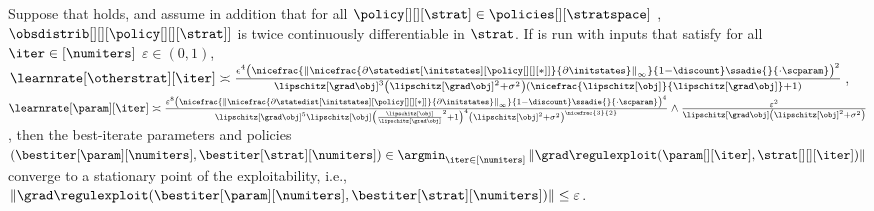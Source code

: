 \begin{reptheorem}[\ref{thm:apprenticeship_thm}]\label{thm_app:apprenticeship_thm}
    Suppose that  holds, and assume in addition that for all $\policy[][][\strat] \in \policies[][\stratspace]$ , $\obsdistrib[][][{\policy[][][\strat]}]$ is twice continuously differentiable in $\strat$.  
    If  is run with inputs that satisfy for all $\iter \in [\numiters]$ $\varepsilon \in (0,1)$,  $\learnrate[\otherstrat][\iter] \asymp  \frac{\epsilon^4 \left(\nicefrac{\left\|\nicefrac{\partial\statedist[\initstates][{\policy[][][*]}]}{\partial \initstates} \right\|_\infty}{1-\discount}\ssadie{}{\cdot \scparam}\right)^2}{\lipschitz[\grad \obj]^3\left(\lipschitz[\grad \obj]^2 + \sigma^2\right) \left( \nicefrac{\lipschitz[\obj]}{\lipschitz[\grad \obj]} + 1\right)} $,  
    $\learnrate[\param][\iter] \asymp \frac{\varepsilon^8 \left(\nicefrac{\left\|\nicefrac{\partial\statedist[\initstates][{\policy[][][*]}]}{\partial \initstates} \right\|_\infty}{1-\discount} \ssadie{}{\cdot \scparam}\right)^4}{\lipschitz[\grad \obj]^5 \lipschitz[\obj] \left(\frac{\lipschitz[\obj]}{\lipschitz[\grad \obj]}^2 + 1\right)^4 \left(\lipschitz[\obj]^2 + \sigma^2\right)^{\nicefrac{3}{2}}} \land \frac{\varepsilon^2}{\lipschitz[\grad \obj] \left(\lipschitz[\obj]^2 + \sigma^2\right)}$, 
      then the best-iterate parameters and policies $(\bestiter[{\param}][\numiters], \bestiter[{\strat}][\numiters]) \in \argmin_{\iter \in [\numiters]} \left\|\grad \regulexploit(\param[][\iter], \strat[][][\iter]) \right\|$ converge to a stationary point of the exploitability, i.e., $\left\|\grad \regulexploit(\bestiter[{\param}][\numiters], \bestiter[{\strat}][\numiters]) \right\| \leq \varepsilon$. 


\end{reptheorem}
